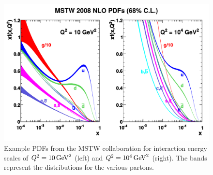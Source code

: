 \begin{figure}[!htb]
    \centering
    \includegraphics[width=\textwidth]{figures/mstw_pdfs.pdf}
    \caption[
        Example PDFs from the MSTW collaboration.
    ]{
        Example PDFs from the MSTW collaboration for interaction energy scales
        of $\InteractionEnergy = \SI{10}{\GeV\squared}$ (left) and
        $\InteractionEnergy = \SI{e4}{\GeV\squared}$ (right). The bands
        represent the  distributions for the various partons.
    }
    \label{fig:mstw_pdf}
\end{figure}
